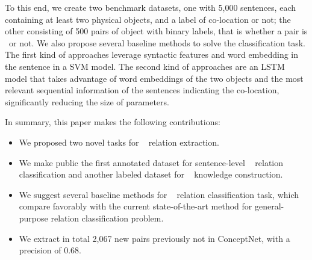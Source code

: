 To this end, we create two 
benchmark datasets, one with 5,000 sentences, 
each containing at least two physical objects,
and a label of co-location or not; the other consisting of 500 pairs of
object with binary labels, that is whether a pair is \lnear\ or not.   
We also propose several baseline methods to solve the classification task.
The first kind of approaches leverage syntactic features and word embedding
in the sentence in a SVM model. The second kind of approaches are an LSTM
model that takes advantage of word embeddings of the 
two objects and the most relevant sequential information of the sentences 
indicating the co-location, significantly reducing the size of 
parameters. 

In summary, this paper makes the following contributions: 
\begin{itemize}
	\item We proposed two novel tasks for \lnear~ relation extraction.
	
	\item We make public the first annotated dataset for 
	sentence-level \lnear~ relation classification and another labeled dataset for
	\lnear~ knowledge construction. 
	
	\item We suggest several baseline methods for \lnear~ relation 
	classification task, 
	which compare favorably with the current state-of-the-art
	method for general-purpose relation classification problem. 
	
	\item We extract in total 2,067 new pairs previously not in
	ConceptNet, with a precision of 0.68.
\end{itemize}


